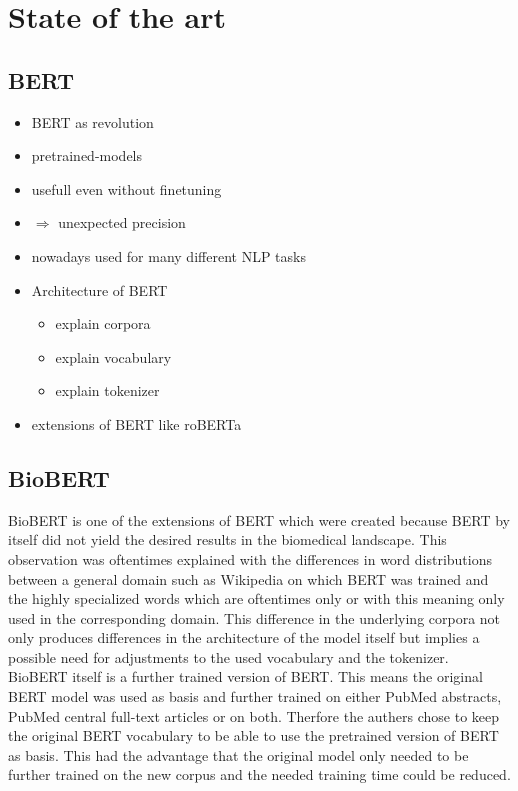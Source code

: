 \chapter{State of the art}
\section{BERT}
\begin{itemize}
	\item BERT as revolution
	\item pretrained-models
	\item usefull even without finetuning
	\item $\Rightarrow$ unexpected precision
	\item nowadays used for many different NLP tasks
	\item Architecture of BERT
	\begin{itemize}
		\item explain corpora
		\item explain vocabulary
		\item explain tokenizer
	\end{itemize}
	\item extensions of BERT like roBERTa
\end{itemize}
\section{BioBERT}
BioBERT is one of the extensions of BERT which were created because BERT by itself did not yield the desired results in the biomedical landscape. This observation was oftentimes explained with the differences in word distributions between a general domain such as Wikipedia on which BERT was trained and the highly specialized words which are oftentimes only or with this meaning only used in the corresponding domain. This difference in the underlying corpora not only produces differences in the architecture of the model itself but implies a possible need for adjustments to the used vocabulary and the tokenizer. \cite{Lee2019}
\newline
BioBERT itself is a further trained version of BERT. This means the original BERT model was used as basis and further trained on either PubMed abstracts, PubMed central full-text articles or on both. Therfore the authers chose to keep the original BERT vocabulary to be able to use the pretrained version of BERT as basis. This had the advantage that the original model only needed to be further trained on the new corpus and the needed training time could be reduced.

